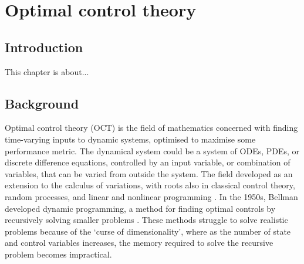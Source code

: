 %
\chapter{Optimal control theory}\label{ch:oct}

\section{Introduction}\label{sec:ch2:intro}

This chapter is about...

\section{Background}\label{sec:ch2:background}

Optimal control theory (OCT) is the field of mathematics concerned with finding time-varying inputs to dynamic systems, optimised to maximise some performance metric. The dynamical system could be a system of ODEs, PDEs, or discrete difference equations, controlled by an input variable, or combination of variables, that can be varied from outside the system. The field developed as an extension to the calculus of variations, with roots also in classical control theory, random processes, and linear and nonlinear programming \citep{bryson_optimal_1996}. In the 1950s, Bellman developed dynamic programming, a method for finding optimal controls by recursively solving smaller problems \citep{bellman_dynamic_2013}. These methods struggle to solve realistic problems because of the `curse of dimensionality', where as the number of state and control variables increases, the memory required to solve the recursive problem becomes impractical.

